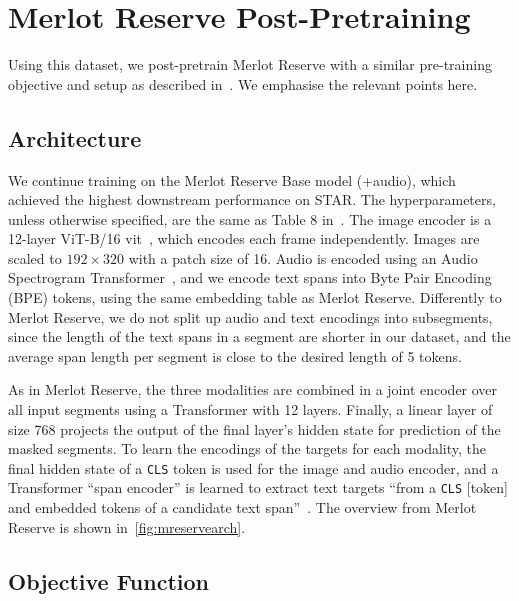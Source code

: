 \section{Merlot Reserve Post-Pretraining}
\label{sec:training}

Using this dataset, we post-pretrain Merlot Reserve with a similar pre-training
objective and setup as described in~\citet{zellers2022mreserve}. We emphasise
the relevant points here.

\subsection{Architecture}
\label{ssec:arch}

We continue training on the Merlot Reserve Base model (+audio), which achieved
the highest downstream performance on STAR. The hyperparameters, unless
otherwise specified, are the same as Table 8 in~\citet{zellers2022mreserve}.
The image encoder is a 12-layer ViT-B/16
\acrlong{vit}~\citep{dosovitskiy2021vit}, which encodes each frame
independently.  Images are scaled to $192 \times 320$ with a patch size of 16.
Audio is encoded using an Audio Spectrogram Transformer~\citep{gong2021ast},
and we encode text spans into Byte Pair Encoding (BPE) tokens, using the same
embedding table as Merlot Reserve.  Differently to Merlot Reserve, we do not
split up audio and text encodings into subsegments, since the length of the
text spans in a segment are shorter in our dataset, and the average span length
per segment is close to the desired length of 5 tokens.

As in Merlot Reserve, the three modalities are combined in a joint encoder over
all input segments using a Transformer with 12 layers. Finally, a linear layer
of size 768 projects the output of the final layer's hidden state for
prediction of the masked segments. To learn the encodings of the targets for
each modality, the final hidden state of a \texttt{CLS} token is used for the
image and audio encoder, and a Transformer ``span encoder'' is learned to
extract text targets ``from a \texttt{CLS} [token] and embedded tokens of a candidate
text span''~\citep{zellers2022mreserve}. The overview from Merlot Reserve is
shown in~\cref{fig:mreservearch}.

\subsection{Objective Function}
\label{ssec:objective}

